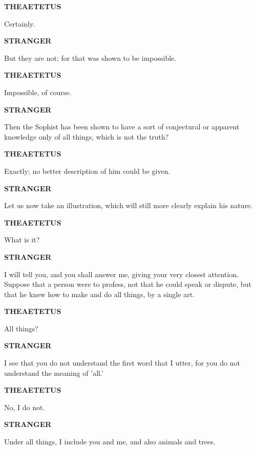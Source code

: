 \documentclass[11pt,letter]{article}
\begin{document}
\par \textbf{THEAETETUS}
\par   Certainly.

\par \textbf{STRANGER}
\par   But they are not; for that was shown to be impossible.

\par \textbf{THEAETETUS}
\par   Impossible, of course.

\par \textbf{STRANGER}
\par   Then the Sophist has been shown to have a sort of conjectural or apparent knowledge only of all things, which is not the truth?

\par \textbf{THEAETETUS}
\par   Exactly; no better description of him could be given.

\par \textbf{STRANGER}
\par   Let us now take an illustration, which will still more clearly explain his nature.

\par \textbf{THEAETETUS}
\par   What is it?

\par \textbf{STRANGER}
\par   I will tell you, and you shall answer me, giving your very closest attention. Suppose that a person were to profess, not that he could speak or dispute, but that he knew how to make and do all things, by a single art.

\par \textbf{THEAETETUS}
\par   All things?

\par \textbf{STRANGER}
\par   I see that you do not understand the first word that I utter, for you do not understand the meaning of 'all.'

\par \textbf{THEAETETUS}
\par   No, I do not.

\par \textbf{STRANGER}
\par   Under all things, I include you and me, and also animals and trees.
\end{document}
